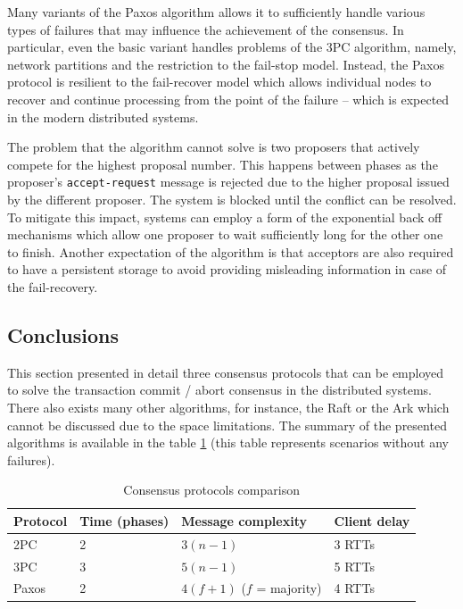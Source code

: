 \documentclass[oneside,
  digital, %
  table,   %
  lof,     %
  lot,     %
]{fithesis3}
\begin{document}
Many variants of the Paxos algorithm allows it to sufficiently handle various types of failures that may influence the achievement of the consensus. In particular, even the basic variant handles problems of the 3PC algorithm, namely, network partitions and the restriction to the fail-stop model. Instead, the Paxos protocol is resilient to the fail-recover model which allows individual nodes to recover and continue processing from the point of the failure -- which is expected in the modern distributed systems.

The problem that the algorithm cannot solve is two proposers that actively compete for the highest proposal number. This happens between phases as the proposer's \texttt{accept-request} message is rejected due to the higher proposal issued by the different proposer. The system is blocked until the conflict can be resolved. To mitigate this impact, systems can employ a form of the exponential back off mechanisms which allow one proposer to wait sufficiently long for the other one to finish. Another expectation of the algorithm is that acceptors are also required to have a persistent storage to avoid providing misleading information in case of the fail-recovery.

\subsection{Conclusions}

This section presented in detail three consensus protocols that can be employed to solve the transaction commit / abort consensus in the distributed systems. There also exists many other algorithms, for instance, the Raft or the Ark which cannot be discussed due to the space limitations. The summary of the presented algorithms is available in the table \ref{tab:consensus-protocols-comparison} (this table represents scenarios without any failures).

\hfill \break
\begin{table}[h]
    \begin{tabularx}{\textwidth}{lllX}
        \toprule
        Protocol & Time (phases) & Message complexity & Client delay \\
        \midrule
        2PC & 2 & $3(n - 1)$ & 3 RTTs \\
        3PC & 3 & $5(n - 1)$ & 5 RTTs \\
        Paxos & 2 & $4(f + 1)$ ($f$ = majority) & 4 RTTs \\
        \bottomrule
    \end{tabularx}
    \caption{Consensus protocols comparison}
    \label{tab:consensus-protocols-comparison}
\end{table}
\end{document}
